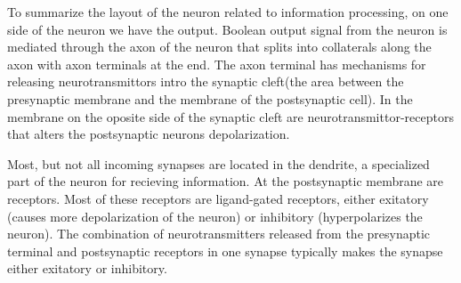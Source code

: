To summarize the layout of the neuron related to information processing, on one side of the neuron we have the output. Boolean output signal from the neuron is mediated through the axon of the neuron that splits into collaterals along the axon with axon terminals at the end. The axon terminal has mechanisms for releasing neurotransmittors intro the synaptic cleft(the area between the presynaptic membrane and the membrane of the postsynaptic cell). 
In the membrane on the oposite side of the synaptic cleft are neurotransmittor-receptors that alters the postsynaptic neurons depolarization. %

Most, but not all incoming synapses are located in the dendrite, a specialized part of the neuron for recieving information. 
At the postsynaptic membrane are receptors. Most of these receptors are ligand-gated receptors, either exitatory (causes more depolarization of the neuron) or inhibitory (hyperpolarizes the neuron). 
The combination of neurotransmitters released from the presynaptic terminal and postsynaptic receptors in one synapse typically makes the synapse either exitatory or inhibitory.





